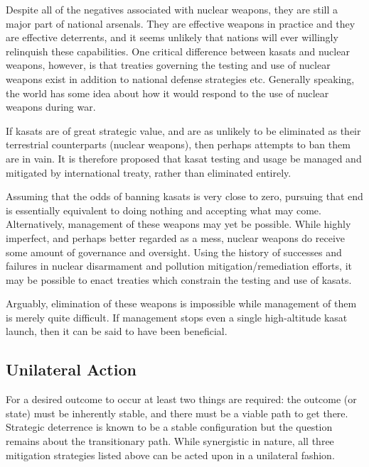 Despite all of the negatives associated with nuclear weapons, they are
still a major part of national arsenals.  They are effective weapons
in practice and they are effective deterrents\cite{getting-mad}, and
it seems unlikely that nations will ever willingly relinquish these
capabilities.  One critical difference between \acp{kasat} and nuclear
weapons, however, is that treaties governing the testing and use of
nuclear weapons exist in addition to national defense strategies etc.
Generally speaking, the world has some idea about how it would respond
to the use of nuclear weapons during war.\cite{old-timey-armageddon}

If \acp{kasat} are of great strategic value, and are as unlikely to be
eliminated as their terrestrial counterparts (nuclear weapons), then
perhaps attempts to ban them are in vain.  It is therefore proposed
that \ac{kasat} testing and usage be managed and mitigated by
international treaty, rather than eliminated entirely.

Assuming that the odds of banning \acp{kasat} is very close to zero,
pursuing that end is essentially equivalent to doing nothing and
accepting what may come.  Alternatively, management of these weapons
may yet be possible.  While highly imperfect, and perhaps better
regarded as a mess, nuclear weapons do receive some amount of
governance and oversight.  Using the history of successes and failures
in nuclear disarmament and pollution mitigation/remediation efforts,
it may be possible to enact treaties which constrain the testing and
use of \acp{kasat}.

Arguably, elimination of these weapons is impossible while management
of them is merely quite difficult.  If management stops even a single
high-altitude \ac{kasat} launch, then it can be said to have been
beneficial.


\subsection{Unilateral Action}

For a desired outcome to occur at least two things are required: the
outcome (or state) must be inherently stable, and there must be a
viable path to get there.\cite{inadequate} Strategic deterrence is
known to be a stable configuration\cite{getting-mad} but the question
remains about the transitionary path.  While synergistic in nature,
all three mitigation strategies listed above can be acted upon in a
unilateral fashion.


